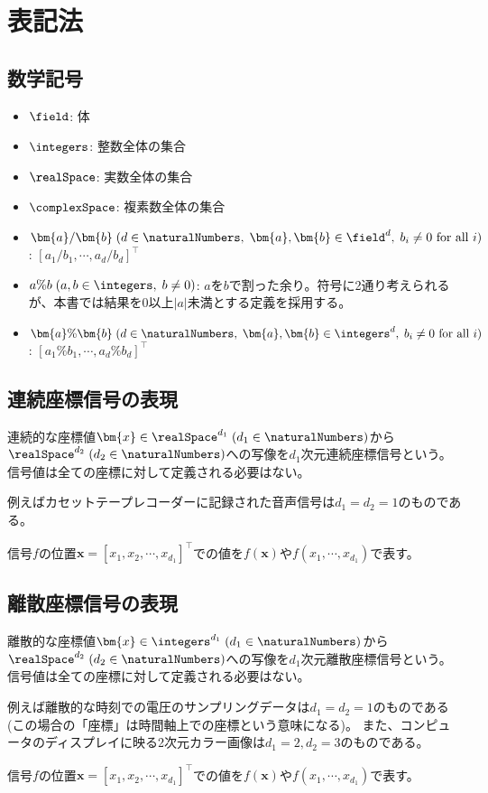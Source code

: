  \part{表記法}
		\chapter{数学記号}
			\begin{itemize}
				\item $\field$: 体
				\item $\integers$: 整数全体の集合
				\item $\realSpace$: 実数全体の集合
				\item $\complexSpace$: 複素数全体の集合
				\item $\bm{a}/\bm{b}\;(d \in \naturalNumbers,\;\bm{a},\bm{b} \in \field^d,\;b_i\neq 0 \text{ for all }i)$: $[a_1/b_1,\cdots,a_d/b_d]^\top$
				\item $a\%b\;(a,b\in\integers,\;b\neq 0)$: $a$を$b$で割った余り。符号に2通り考えられるが、本書では結果を0以上$|a|$未満とする定義を採用する。
				\item $\bm{a}\%\bm{b}\;(d\in\naturalNumbers,\;\bm{a},\bm{b} \in \integers^d,\; b_i\neq 0 \text{ for all }i)$: $[a_1\%b_1,\cdots,a_d\%b_d]^\top$
			\end{itemize}
		
		\chapter{連続座標信号の表現}
			連続的な座標値$\bm{x}\in\realSpace^{d_1}\;(d_1\in\naturalNumbers)$から$\realSpace^{d_2}\;(d_2\in\naturalNumbers)$への写像を$d_1$次元連続座標信号という。
			信号値は全ての座標に対して定義される必要はない。
			\par
			例えばカセットテープレコーダーに記録された音声信号は$d_1=d_2=1$のものである。
			\par
			信号$f$の位置$\bm{x} = [x_1,x_2,\cdots,x_{d_1}]^\top$での値を$f(\bm{x})$や$f(x_1,\cdots,x_{d_1})$で表す。

		\chapter{離散座標信号の表現}
			離散的な座標値$\bm{x}\in\integers^{d_1}\;(d_1\in\naturalNumbers)$から$\realSpace^{d_2}\;(d_2\in\naturalNumbers)$への写像を$d_1$次元離散座標信号という。
			信号値は全ての座標に対して定義される必要はない。
			\par
			例えば離散的な時刻での電圧のサンプリングデータは$d_1=d_2=1$のものである(この場合の「座標」は時間軸上での座標という意味になる)。
			また、コンピュータのディスプレイに映る2次元カラー画像は$d_1=2,d_2=3$のものである。
			\par
			信号$f$の位置$\bm{x} = [x_1,x_2,\cdots,x_{d_1}]^\top$での値を$f(\bm{x})$や$f(x_1,\cdots,x_{d_1})$で表す。
